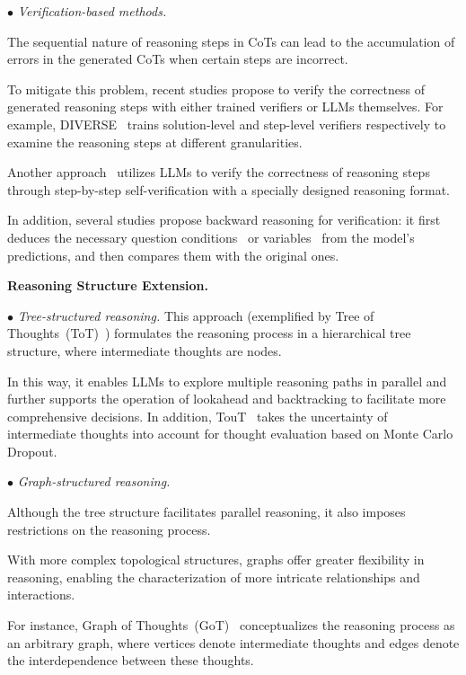 {{{{{$\bullet$ \emph{Verification-based methods.} { The sequential nature of reasoning steps in CoTs can lead to the accumulation of errors in the generated CoTs when certain steps are incorrect. 

To mitigate this problem, recent studies propose to verify the correctness of generated reasoning steps with either trained verifiers or LLMs themselves. For example, DIVERSE~\cite{Li-arxiv-2023-Making} trains solution-level and step-level verifiers respectively to examine the reasoning steps at different granularities. 

Another approach~\cite{Ling-arxiv-2023-Deductive} utilizes LLMs to verify the correctness of reasoning steps through step-by-step self-verification with a specially designed reasoning format.

In addition, several studies propose backward reasoning for verification: it first deduces the necessary question conditions~\cite{Xue-arxiv-2023-RCOT, Weng-arxiv-2023-Large} or variables~\cite{Jiang-arxiv-2023-Forward} {from the model's predictions}, and then compares them with the original ones. }

\textbf{Reasoning Structure Extension.}   

$\bullet$ \emph{Tree-structured reasoning.} This approach (exemplified by Tree of Thoughts~(ToT)~\cite{Yao-arxiv-2023-Tree, Long-arxiv-2023-Large}) formulates the reasoning process in a hierarchical tree structure, where intermediate thoughts are nodes.

{In this way, it enables  LLMs to explore multiple reasoning paths in parallel and further supports the operation of lookahead and backtracking to facilitate more comprehensive decisions.} In addition, TouT~\cite{Mo-arxiv-2023-Tree} takes the uncertainty of intermediate thoughts into account for thought evaluation based on Monte Carlo Dropout.

$\bullet$ \emph{Graph-structured reasoning.} { Although the tree structure facilitates parallel reasoning, it also imposes restrictions on the reasoning process.

With more complex topological structures, graphs offer greater flexibility in reasoning, enabling the characterization of more intricate relationships and interactions.

For instance, Graph of Thoughts~(GoT)~\cite{Besta-arxiv-2023-Graph, Lei-arxiv-2023-Boosting} conceptualizes the reasoning process as an arbitrary graph, where vertices denote intermediate thoughts and edges denote the interdependence between these thoughts. 

}}}}}}
